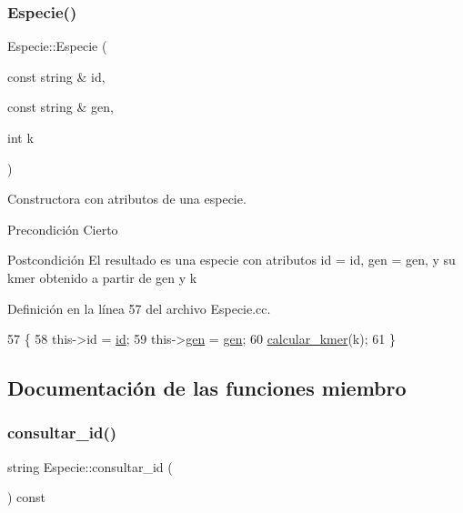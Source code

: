 \subsubsection{\texorpdfstring{Especie()}{Especie()}\hspace{0.1cm}{\footnotesize\ttfamily [2/2]}}
{\footnotesize\ttfamily Especie\+::\+Especie (\begin{DoxyParamCaption}\item[{const string \&}]{id,  }\item[{const string \&}]{gen,  }\item[{int}]{k }\end{DoxyParamCaption})}



Constructora con atributos de una especie. 

\begin{DoxyPrecond}{Precondición}
Cierto 
\end{DoxyPrecond}
\begin{DoxyPostcond}{Postcondición}
El resultado es una especie con atributos \textquotesingle{}id\textquotesingle{} = id, \textquotesingle{}gen\textquotesingle{} = gen, y su \textquotesingle{}kmer\textquotesingle{} obtenido a partir de gen y k 
\end{DoxyPostcond}


Definición en la línea 57 del archivo Especie.\+cc.


\begin{DoxyCode}
57                                                            \{
58   this->\textcolor{keywordtype}{id} = \hyperlink{class_especie_a91b94109fb8a456bba7199cdda36d588}{id};
59   this->\hyperlink{class_especie_ac35bb565f7346cd6317b3a8c849456d1}{gen} = \hyperlink{class_especie_ac35bb565f7346cd6317b3a8c849456d1}{gen};
60   \hyperlink{class_especie_a83fdef791142b0887bfa7f45bd0d5e0e}{calcular\_kmer}(k);
61 \}
\end{DoxyCode}


\subsection{Documentación de las funciones miembro}
\mbox{\label{class_especie_a1652f05cd2ff7dc71123bf538ecc4476}} 
\subsubsection{\texorpdfstring{consultar\+\_\+id()}{consultar\_id()}}
{\footnotesize\ttfamily string Especie\+::consultar\+\_\+id (\begin{DoxyParamCaption}{ }\end{DoxyParamCaption}) const}



